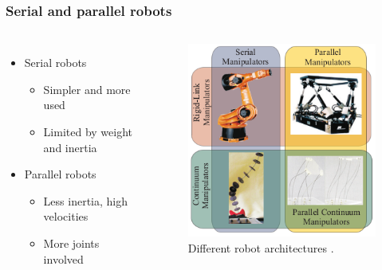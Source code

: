 \documentclass[compress]{thesisbeamer}
\begin{document}
        \begin{frame}
        	\frametitle{Serial and parallel robots}
            \begin{columns}
			\begin{itemize}%
  				\item Serial robots
  				\begin{itemize}%
   					\item Simpler and more used
   					\item Limited by weight and inertia
  				\end{itemize}\vfill
  				\item Parallel robots
  				\begin{itemize}%
   					\item Less inertia, high velocities
   					\item More joints involved
  				\end{itemize}\vfill
 			\end{itemize}
			\begin{figure}[h]
				\centering
				\includegraphics[width=\textwidth]{images/serial_parall_robots}
				\caption{Different robot architectures \cite{bryson_toward_2014}.}	
			\end{figure}
			\end{columns}
		\end{frame}
\end{document}
